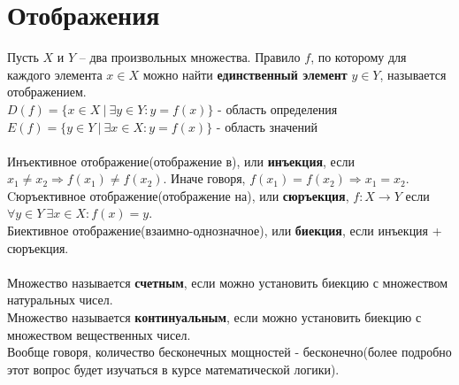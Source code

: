\documentclass[a4paper]{article}
\begin{document}
\section{Отображения}
Пусть $X$ и $Y$ – два произвольных множества. Правило $f$, по
которому для каждого элемента $x \in X$ можно найти \textbf{единственный элемент} $y \in Y$, называется отображением. \\
$D(f) = \{x \in X \ | \  \exists y \in Y : y = f(x)\}$ - область определения\\
$E(f) = \{y \in Y \ | \  \exists x \in X : y = f(x)\}$ - область значений\\\\
Инъективное отображение(отображение в), или \textbf{инъекция}, если $x_1 \neq x_2 \Rightarrow f(x_1) \neq f(x_2)$. Иначе говоря, $f(x_1) = f(x_2) \Rightarrow x_1 = x_2$.
\\
Cюръективное отображение(отображение на), или \textbf{сюръекция}, $f:X \xrightarrow 
\  Y$ если $\forall y \in Y \ \exists x \in X : f(x) = y$.\\
Биективное отображение(взаимно-однозначное), или \textbf{биекция}, если инъекция + сюръекция.\\\\
Множество называется \textbf{счетным}, если можно установить биекцию с множеством натуральных чисел.\\
Множество называется \textbf{континуальным}, если можно установить биекцию с множеством вещественных чисел.\\
Вообще говоря, количество бесконечных мощностей - бесконечно(более подробно этот вопрос будет изучаться в курсе математической логики).
\end{document}
